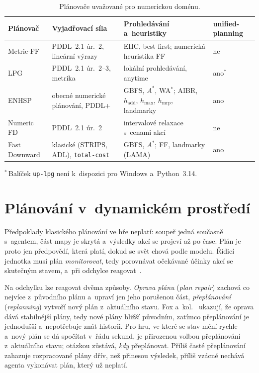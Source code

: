 \begin{table}[ht]
	\centering
	\caption{Plánovače uvažované pro numerickou doménu.}
	\label{tab:planovace}
	\begin{tabularx}{\textwidth}{@{} l >{\raggedright\arraybackslash}X >{\raggedright\arraybackslash}X l @{}}
		\toprule
		\textbf{Plánovač} & \textbf{Vyjadřovací síla} & \textbf{Prohledávání a~heuristiky} & \textbf{unified-planning} \\
		\midrule
		Metric-FF & PDDL~2.1 úr.~2, lineární výrazy & EHC, best-first; numerická heuristika FF & ne \\
		\addlinespace
		LPG & PDDL~2.1 úr.~2--3, metrika & lokální prohledávání, anytime & ano$^{*}$ \\
		\addlinespace
		ENHSP & obecné numerické plánování, PDDL+ & GBFS, $A^*$, WA$^*$; AIBR, $h_{\mathrm{add}}$, $h_{\max}$, $h_{\mathrm{mrp}}$, landmarky & ano \\
		\addlinespace
		Numeric FD & PDDL~2.1 úr.~2 & intervalové relaxace s~cenami akcí & ne \\
		\addlinespace
		Fast Downward & klasické (STRIPS, ADL), \texttt{total-cost} & GBFS, $A^*$; FF, landmarky (LAMA) & ano \\
		\bottomrule
	\end{tabularx}
	\par\smallskip\raggedright\footnotesize $^{*}$\,Balíček \texttt{up-lpg} není k~dispozici pro Windows a~Python~3.14.
\end{table}

\section{Plánování v~dynamickém prostředí}
\label{sec:dynamicke}

Předpoklady klasického plánování ve hře neplatí: soupeř jedná současně s~agentem, část mapy je skrytá a~výsledky akcí se projeví až po čase. Plán je proto jen předpovědí, která platí, dokud se svět chová podle modelu. Řídicí jednotka musí plán \emph{monitorovat}, tedy porovnávat očekávané účinky akcí se skutečným stavem, a~při odchylce reagovat~\cite{Ghallab2004}.

Na odchylku lze reagovat dvěma způsoby. \emph{Oprava plánu} (\emph{plan repair}) zachová co nejvíce z~původního plánu a~upraví jen jeho porušenou část, \emph{přeplánování} (\emph{replanning}) vytvoří nový plán z~aktuálního stavu. Fox a~kol.~\cite{Fox2006} ukazují, že oprava dává stabilnější plány, tedy nové plány bližší původním, zatímco přeplánování je jednodušší a~nepotřebuje znát historii. Pro hru, ve které se stav mění rychle a~nový plán se dá spočítat v~řádu sekund, je přirozenou volbou přeplánování z~aktuálního stavu; otázkou zůstává, \emph{kdy} přeplánovat. Příliš časté přeplánování zahazuje rozpracované plány dřív, než přinesou výsledek, příliš vzácné nechává agenta vykonávat plán, který už neplatí.

